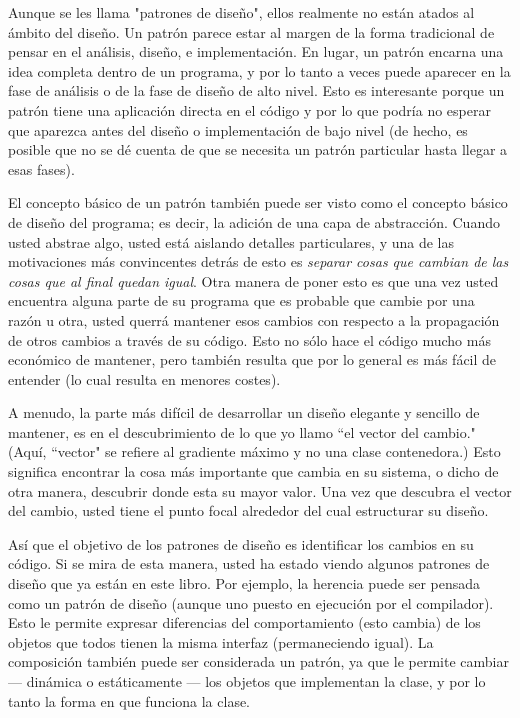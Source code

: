 Aunque se les llama "patrones de diseño", ellos realmente no están atados al ámbito del diseño. Un patrón parece estar al margen de la forma tradicional de pensar en el análisis, diseño, e implementación. En lugar, un patrón encarna una idea completa dentro de un programa, y por lo tanto a veces puede aparecer en la fase de análisis o de la fase de diseño de alto nivel. Esto es interesante porque un patrón tiene una aplicación directa en el código y por lo que podría no esperar que aparezca antes del diseño o implementación de bajo nivel (de hecho, es posible que no se dé cuenta de que se necesita un patrón particular hasta llegar a esas fases).      \newline

El concepto básico de un patrón también puede ser visto como el concepto básico de diseño del programa; es decir, la adición de una capa de abstracción. Cuando usted abstrae algo, usted está aislando detalles particulares, y una de las motivaciones más convincentes detrás de esto es \textit{separar cosas que cambian de las cosas que al final quedan igual}. Otra manera de poner esto es que una vez usted encuentra alguna parte de su programa que es probable que cambie por una razón u otra, usted querrá mantener esos cambios con respecto a la propagación de otros cambios a través de su código. Esto no sólo hace el código mucho más económico de mantener, pero también resulta que por lo general es más fácil de entender (lo cual resulta en menores costes).    \newline

A menudo, la parte más difícil de desarrollar un diseño elegante y sencillo de mantener, es en el descubrimiento de lo que yo llamo “el vector del cambio." (Aquí,  “vector" se refiere al gradiente máximo y no una clase contenedora.) Esto significa encontrar la cosa más importante que cambia en su sistema, o dicho de otra manera, descubrir donde esta su mayor valor. Una vez que descubra el vector del cambio, usted tiene el punto focal alrededor del cual estructurar su diseño.      \newline

Así que el objetivo de los patrones de diseño es identificar los cambios en su código. Si se mira de esta manera, usted ha estado viendo algunos patrones de diseño que ya están en este libro. Por ejemplo, la herencia puede ser pensada como un patrón de diseño (aunque uno puesto en ejecución por el compilador). Esto le permite expresar diferencias del comportamiento (esto cambia) de los objetos que todos tienen la misma interfaz (permaneciendo igual). La composición también puede ser considerada un patrón, ya que le permite cambiar — dinámica o estáticamente — los objetos que implementan la clase, y por lo tanto la forma en que funciona la clase. \\

